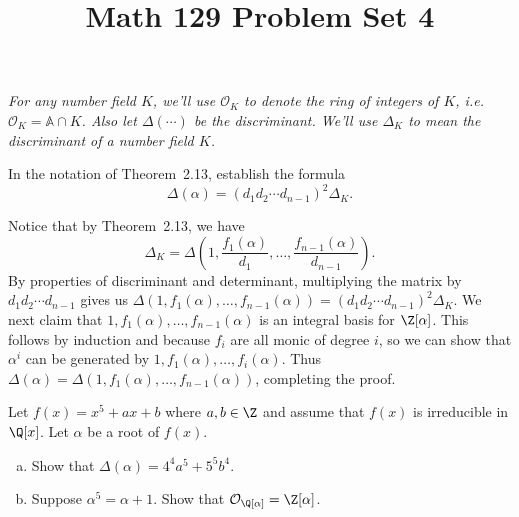 \documentclass[11pt,letterpaper]{article}
\title{\textbf{Math 129 Problem Set 4}}
\begin{document}
\maketitle

\textit{For any number field $K$, we'll use $\mathcal{O}_K$ to denote the ring of integers of $K$, i.e. $\mathcal{O}_K = \mathbb{A}\cap K$. Also let $\Delta(\cdots)$ be the discriminant. We'll use $\Delta_K$ to mean the discriminant of a number field $K$.}

\begin{cproblem}{2.40}
    In the notation of Theorem~2.13, establish the formula
    \[
        \Delta(\alpha)=(d_1d_2\cdots d_{n-1})^2\Delta_K 
    .\] 
\end{cproblem}

\begin{solution}
    Notice that by Theorem~2.13, we have
    \[
        \Delta_K = \Delta\left(1, \frac{f_1(\alpha)}{d_1}, \ldots, \frac{f_{n-1}(\alpha)}{d_{n-1}}\right).
    \]  
    By properties of discriminant and determinant, multiplying the matrix by $d_1d_2\cdots d_{n-1}$ gives us $\Delta(1,f_1(\alpha),\ldots,f_{n-1}(\alpha))=(d_1d_2\cdots d_{n-1})^2\Delta_K$. We next claim that $1,f_1(\alpha),\ldots,f_{n-1}(\alpha)$ is an integral basis for $\Z[\alpha]$. This follows by induction and because $f_i$ are all monic of degree $i$, so we can show that $\alpha^i$ can be generated by $1,f_1(\alpha),\ldots,f_i(\alpha)$. Thus $\Delta(\alpha)=\Delta(1,f_1(\alpha),\ldots,f_{n-1}(\alpha))$, completing the proof.    
\end{solution}

\begin{cproblem}{2.43}
    Let $f(x)=x^5+ax+b$ where $a,b\in \Z$ and assume that $f(x)$ is irreducible in $\Q[x]$. Let $\alpha$ be a root of $f(x)$.
    \begin{enumerate}[(a)]
        \item Show that $\Delta(\alpha)=4^4a^5+5^5b^4$.
        \item Suppose $\alpha^5=\alpha+1$. Show that $\mathcal{O}_{\Q[\alpha]}=\Z[\alpha]$. 
    \end{enumerate}
\end{cproblem}
\end{document}
